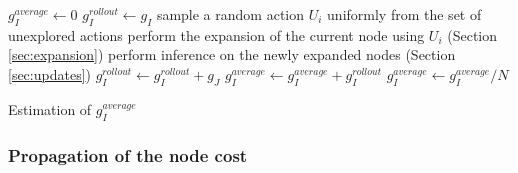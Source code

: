 \documentclass[twoside,11pt]{article}
\begin{document}
\begin{algorithm}[H]
\label{algo:roll-out}
\SetAlgoLined
{}
 $g_I^{average} \leftarrow 0$ 
  {
 $g_I^{rollout} \leftarrow g_I$ 
  {
  sample a random action $U_i$ uniformly from the set of unexplored actions\;
  perform the expansion of the current node using $U_i$ (Section \ref{sec:expansion})\;
  perform inference on the newly expanded nodes (Section \ref{sec:updates})\;
  $g_I^{rollout} \leftarrow g_I^{rollout} + g_{J}$ 
 }
 $g_I^{average} \leftarrow g_I^{average} + g_I^{rollout}$\;
 }
 $g_I^{average} \leftarrow g_I^{average} / N$\;
 \caption{Estimation of $g_I^{average}$}
\end{algorithm}

\subsubsection{Propagation of the node cost} \label{sec:propagation}
\end{document}
